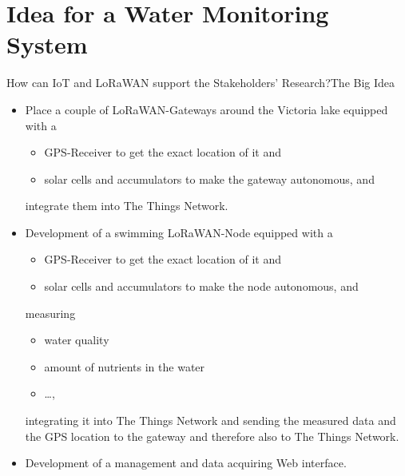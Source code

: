 \section[nosectionpage]{Idea for a Water Monitoring System}

\begin{frame}{How can \alert{IoT and LoRaWAN} support the Stakeholders' Research?}{The Big Idea}
\begin{description}
\item[Measuring Water Chemistry] \begin{itemize}
    \item Place a couple of LoRaWAN-Gateways around the Victoria lake equipped with a
    \begin{itemize}
        \item GPS-Receiver to get the exact location of it and
        \item solar cells and accumulators to make the gateway autonomous, and
    \end{itemize}
    integrate them into The Things Network.
    \item Development of a swimming LoRaWAN-Node equipped with a
    \begin{itemize}
        \item GPS-Receiver to get the exact location of it and
        \item solar cells and accumulators to make the node autonomous, and
    \end{itemize}
    measuring
    \begin{itemize}
        \item water quality
        \item amount of nutrients in the water
        \item \ldots,
    \end{itemize}
    integrating it into The Things Network and sending the measured data and the GPS location to the gateway and therefore also to The Things Network.
    \item Development of a management and data acquiring Web interface.
\end{itemize}
\end{description}
\end{frame}
